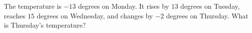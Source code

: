 The temperature is $-13 $ degrees on Monday. It rises by $ 13 $ degrees on Tuesday, reaches $ 15 $ degrees on Wednesday, and changes by $-2 $ degrees on Thursday. What is Thursday's temperature?
